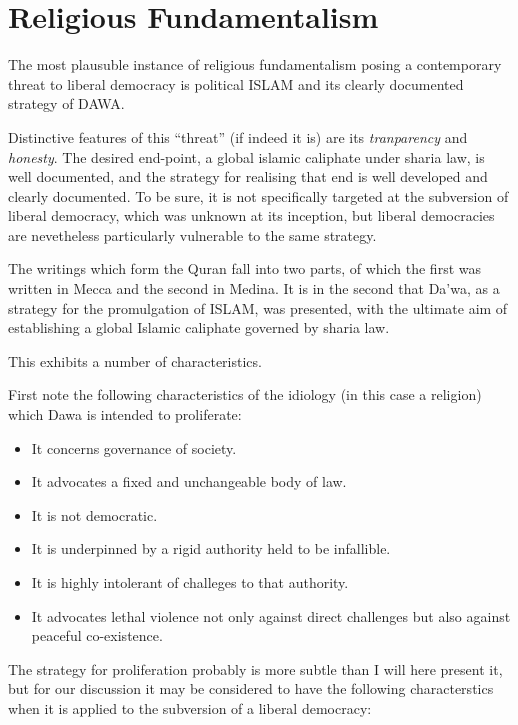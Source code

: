 \documentclass[10pt,titlepage]{article}
\begin{document}
\section{Religious Fundamentalism}

The most plausuble instance of religious fundamentalism posing a contemporary threat to liberal democracy is political ISLAM and its clearly documented strategy of DAWA.

Distinctive features of this ``threat'' (if indeed it is) are its \emph{tranparency} and \emph{honesty}.
The desired end-point, a global islamic caliphate under sharia law, is well documented, and the strategy for realising that end is well developed and clearly documented.
To be sure, it is not specifically targeted at the subversion of liberal democracy, which was unknown at its inception, but liberal democracies are nevetheless particularly vulnerable to the same strategy.

The writings which form the Quran fall into two parts, of which the first was written in Mecca and the second in Medina.
It is in the second that Da'wa, as a strategy for the promulgation of ISLAM, was presented, with the ultimate aim of establishing a global Islamic caliphate governed by sharia law.

This exhibits a number of characteristics.

First note the following characteristics of the idiology (in this case a religion) which Dawa is intended to proliferate:

\begin{itemize}
\item It concerns governance of society.
\item It advocates a fixed and unchangeable body of law.
\item It is not democratic.
\item It is underpinned by a rigid authority held to be infallible.
\item It is highly intolerant of challeges to that authority.
\item It advocates lethal violence not only against direct challenges but also against peaceful co-existence.
\end{itemize}

The strategy for proliferation probably is more subtle than I will here present it, but for our discussion it may be considered to have the following characterstics when it is applied to the subversion of a liberal democracy:
\end{document}
